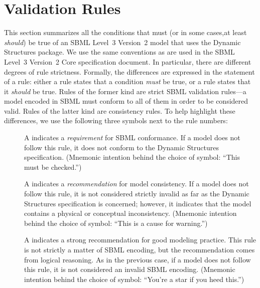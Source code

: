\newcommand{\printValid}{\validRule{arrays-\arabic{arraysCtr}\addtocounter{arraysCtr}{1}}}
\section{Validation Rules}
\label{validation}

This section summarizes all the conditions that must (or in some cases,at least \emph{should}) be true of an SBML Level~3 Version~2 model that uses the Dynamic Structures package. We use the same conventions as are used in the SBML Level~3 Version~2 Core specification document.  In particular, there are different degrees of rule strictness. Formally, the differences are expressed in the statement of a rule: either a rule states that a condition \emph{must} be true, or a rule states that it \emph{should} be true. Rules of the former kind are strict SBML validation rules---a model encoded in SBML must conform to all of them in order to be considered valid.  Rules of the latter kind are consistency rules.  To help highlight these differences, we use the following three symbols next to the rule numbers:

\begin{description}

\item[\hspace*{6.5pt}\vSymbol\vsp] A \vSymbolName indicates a
  \emph{requirement} for SBML conformance. If a model does not follow
  this rule, it does not conform to the Dynamic Structures
  specification.  (Mnemonic intention behind the choice of symbol:
  ``This must be checked.'')

\item[\hspace*{6.5pt}\cSymbol\csp] A \cSymbolName indicates a
  \emph{recommendation} for model consistency.  If a model does not
  follow this rule, it is not considered strictly invalid as far as the
  Dynamic Structures specification is concerned; however, it
  indicates that the model contains a physical or conceptual
  inconsistency.  (Mnemonic intention behind the choice of symbol:
  ``This is a cause for warning.'')

\item[\hspace*{6.5pt}\mSymbol\msp] A \mSymbolName indicates a strong
  recommendation for good modeling practice.  This rule is not strictly
  a matter of SBML encoding, but the recommendation comes from logical
  reasoning.  As in the previous case, if a model does not follow this
  rule, it is not considered an invalid SBML encoding.  (Mnemonic
  intention behind the choice of symbol: ``You're a star if you heed
  this.'')
\end{description}


